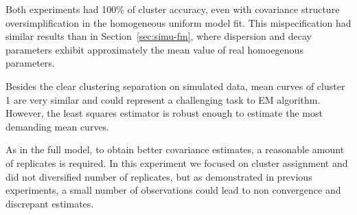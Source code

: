 Both experiments had 100\% of cluster accuracy, even with covariance structure oversimplification in the homogeneous uniform model fit. This mispecification had similar results than in Section~\ref{sec:simu-fm}, where dispersion and decay parameters exhibit approximately the mean value of real homoegenous parameters.

Besides the clear clustering separation on simulated data, mean curves of cluster 1 are very similar and could represent a challenging task to EM algorithm. However, the least squares estimator is robust enough to estimate the most demanding mean curves.

As in the full model, to obtain better covariance estimates, a reasonable amount of replicates is required. In this experiment we focused on cluster assignment and did not diversified number of replicates, but as demonstrated in previous experiments, a small number of observations could lead to non convergence and discrepant estimates. 
